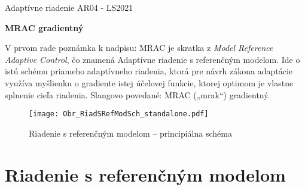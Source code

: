 \documentclass[a4paper, 10pt, ]{article}
\def\oznacenieCasti{AR04 - LS2021}
\begin{document}
\lstset{%
style=mystyle,
rangebeginprefix=\#\#\#\ cellB\ ,%
rangebeginsuffix=\ \#\#\#,%
rangeendprefix=\#\#\#\ cellE\ ,%
rangeendsuffix=\ \#\#\#,%
includerangemarker=false,
}





\fontsize{12pt}{22pt}\selectfont

\centerline{\textsf{Adaptívne riadenie} \hfill \textsf{\oznacenieCasti}}

\fontsize{18pt}{22pt}\selectfont





\begin{flushleft}
	\textbf{\textsf{MRAC gradientný}}
\end{flushleft}





\normalsize

\bigskip

{\hypersetup{hidelinks}

\tableofcontents

}

\bigskip

\vspace{18pt}






\noindent
V prvom rade poznámka k nadpisu: MRAC je skratka z \emph{Model Reference Adaptive Control}, čo znamená Adaptívne riadenie s referenčným modelom. Ide o istú schému priameho adaptívneho riadenia, ktorá pre návrh zákona adaptácie využíva myšlienku o gradiente istej účelovej funkcie, ktorej optimom je vlastne splnenie cieľa riadenia. Slangovo povedané: MRAC („mrak“) gradientný.








\begin{figure}[!b]
\centering

	\texttt{[image: Obr\_RiadSRefModSch\_standalone.pdf]}

	\caption{Riadenie s referenčným modelom -- principiálna schéma}
	\label{Riadenie s referenčným modelom --- principiálna schéma}

\end{figure}





\section{Riadenie s referenčným modelom}
\end{document}
